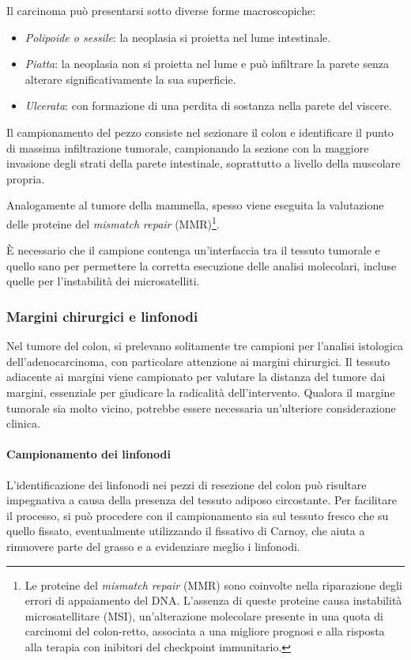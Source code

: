 Il carcinoma può presentarsi sotto diverse forme macroscopiche:
\begin{itemize}
    \item \textit{Polipoide o sessile}: la neoplasia si proietta nel lume intestinale.
    \item \textit{Piatta}: la neoplasia non si proietta nel lume e può infiltrare la parete senza alterare significativamente la sua superficie.
    \item \textit{Ulcerata}: con formazione di una perdita di sostanza nella parete del viscere.
\end{itemize}

Il campionamento del pezzo consiste nel sezionare il colon e identificare il punto di massima infiltrazione tumorale, campionando la sezione con la maggiore invasione degli strati della parete intestinale, soprattutto a livello della muscolare propria.

Analogamente al tumore della mammella, spesso viene eseguita la valutazione delle proteine del \textit{mismatch repair} (MMR)\footnote{Le proteine del \textit{mismatch repair} (MMR) sono coinvolte nella riparazione degli errori di appaiamento del DNA. L'assenza di queste proteine causa instabilità microsatellitare (MSI), un'alterazione molecolare presente in una quota di carcinomi del colon-retto, associata a una migliore prognosi e alla risposta alla terapia con inibitori del checkpoint immunitario.}. 

È necessario che il campione contenga un'interfaccia tra il tessuto tumorale e quello sano per permettere la corretta esecuzione delle analisi molecolari, incluse quelle per l'instabilità dei microsatelliti.

\subsubsection{Margini chirurgici e linfonodi}
Nel tumore del colon, si prelevano solitamente tre campioni per l'analisi istologica dell'adenocarcinoma, con particolare attenzione ai margini chirurgici. Il tessuto adiacente ai margini viene campionato per valutare la distanza del tumore dai margini, essenziale per giudicare la radicalità dell'intervento. Qualora il margine tumorale sia molto vicino, potrebbe essere necessaria un'ulteriore considerazione clinica.

\paragraph{Campionamento dei linfonodi}
L'identificazione dei linfonodi nei pezzi di resezione del colon può risultare impegnativa a causa della presenza del tessuto adiposo circostante. Per facilitare il processo, si può procedere con il campionamento sia sul tessuto fresco che su quello fissato, eventualmente utilizzando il fissativo di Carnoy, che aiuta a rimuovere parte del grasso e a evidenziare meglio i linfonodi.


